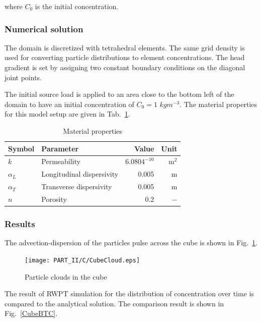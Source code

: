 where $C_0$ is the initial concentration.

\subsubsection{Numerical solution}

The domain is discretized with tetrahedral elements. The same grid density is used for converting particle distributions to element concentrations. The head gradient is set by assigning two constant boundary conditions on the diagonal joint points.

The initial source load is applied to an area close to the bottom left of the domain to have an initial concentration of $C _0=1$ $kg m^{-3}$. The material properties for this model setup are given in Tab.~\ref{tab-3dhomo}.

\begin{table}[htbp!]
\caption{\label{tab-3dhomo}Material properties}
\begin{center}
\begin{tabular}{llrr}
\toprule
Symbol & Parameter & Value & Unit \\
\midrule
$k$         & Permeability                    & $6.0804^{-10}$   & m$^{2}$ \\			
$\alpha _L$	& Longitudinal dispersivity       & 0.005              & m \\
$\alpha _T$	& Transverse dispersivity         & 0.005              & m \\
$n$         & Porosity        		            & 0.2                & $-$ \\
\bottomrule
\end{tabular}
\end{center}
\end{table}

\subsubsection{Results}

The advection-dispersion of the particles pulse across the cube is shown in Fig.~\ref{CubeCloud}.

\begin{figure}[htbp!]
\centering
\texttt{[image: PART\_II/C/CubeCloud.eps]}
\caption{Particle clouds in the cube}
\label{CubeCloud}
\end{figure}

The result of RWPT simulation for the distribution of concentration over time is compared to the analytical solution. The comparison result is shown in Fig.~\ref{CubeBTC}.

